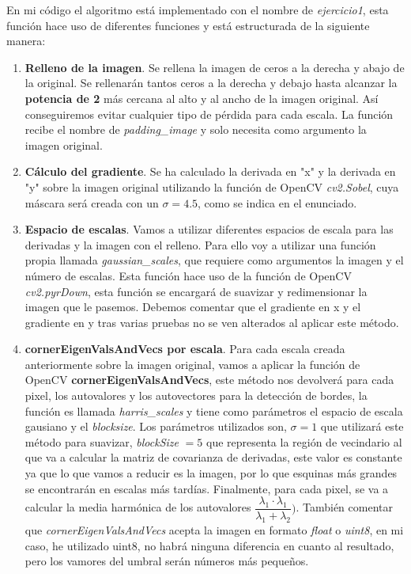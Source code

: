 \documentclass{article}
\begin{document}
En mi código el algoritmo está implementado con el nombre de \textit{ejercicio1}, esta función hace uso de diferentes funciones y está estructurada de la siguiente manera:
\begin{enumerate}
	\item  \textbf{Relleno de la imagen}. Se rellena la imagen de ceros a la derecha y abajo de la original. Se rellenarán tantos ceros a la derecha y debajo hasta alcanzar la \textbf{potencia de 2} más cercana al alto y al ancho de la imagen original. Así conseguiremos evitar cualquier tipo de pérdida para cada escala. La función recibe el nombre de \textit{padding\_image} y solo necesita como argumento la imagen original.
	\item \textbf{Cálculo del gradiente}. Se ha calculado la derivada en "x" y la derivada en "y" sobre la imagen original utilizando la función de OpenCV \textit{cv2.Sobel}, cuya máscara será creada con un $\sigma=4.5$, como se indica en el enunciado.
	\item \textbf{Espacio de escalas}. Vamos a utilizar diferentes espacios de escala para las derivadas y la imagen con el relleno. Para ello voy a utilizar una función propia llamada \textit{gaussian\_scales}, que requiere como argumentos la imagen y el número de escalas. Esta función hace uso de la función de OpenCV \textit{cv2.pyrDown}, esta función se encargará de suavizar y redimensionar la imagen que le pasemos. Debemos comentar que el gradiente en x y el gradiente en y tras varias pruebas no se ven alterados al aplicar este método. 
	\item \textbf{cornerEigenValsAndVecs por escala}. Para cada escala creada anteriormente sobre la imagen original, vamos a aplicar la función de OpenCV \textbf{cornerEigenValsAndVecs}, este método nos devolverá para cada pixel, los autovalores y los autovectores para la detección de bordes, la función es llamada \textit{harris\_scales} y tiene como parámetros el espacio de escala gausiano y el \textit{blocksize}. Los parámetros utilizados son, $\sigma=1$ que utilizará este método para suavizar, \textit{blockSize} $= 5$ que representa la región de vecindario al que va a calcular la matriz de covarianza de derivadas, este valor es constante ya que lo que vamos a reducir es la imagen, por lo que esquinas más grandes se encontrarán en escalas más tardías. Finalmente, para cada pixel, se va a calcular la media harmónica de los autovalores $\dfrac{\lambda_1 \cdot \lambda_1}{\lambda_1+\lambda_2})$.\newline
	También comentar que \textit{cornerEigenValsAndVecs} acepta la imagen en formato \textit{float} o \textit{uint8}, en mi caso, he utilizado uint8, no habrá ninguna diferencia en cuanto al resultado, pero los vamores del umbral serán números más pequeños.

\end{enumerate}
\end{document}
